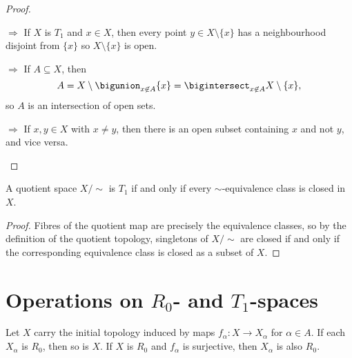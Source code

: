 \documentclass[article, a4paper, 11pt, oneside]{memoir}
\numberwithin{equation}{chapter}
\renewcommand{\implies}{\Rightarrow}
\begin{document}
\begin{proof}
\begin{proofsec}
    \item[\subcref{enum:T1-space} $\implies$ \subcref{enum:T1-singletons-closed}]
    If $X$ is $T_1$ and $x \in X$, then every point $y \in X \setminus \{x\}$ has a neighbourhood disjoint from $\{x\}$ so $X \setminus \{x\}$ is open.

    \item[\subcref{enum:T1-singletons-closed} $\implies$ \subcref{enum:T1-intersection-of-nhoods}]
    If $A \subseteq X$, then
    \begin{equation*}
        A   = X \setminus \bigunion_{x \not\in A} \{x\}
            = \bigintersect_{x \not\in A} X \setminus \{x\},
    \end{equation*}
    so $A$ is an intersection of open sets.

    \item[\subcref{enum:T1-intersection-of-nhoods} $\implies$ \subcref{enum:T1-space}]
    If $x,y \in X$ with $x \neq y$, then there is an open subset containing $x$ and not $y$, and vice versa.
\end{proofsec}
\end{proof}


\begin{corollary}
    \label{cor:T1-quotient}
    A quotient space $X/{\sim}$ is $T_1$ if and only if every $\sim$-equivalence class is closed in $X$.
\end{corollary}

\begin{proof}
    Fibres of the quotient map are precisely the equivalence classes, so by the definition of the quotient topology, singletons of $X/{\sim}$ are closed if and only if the corresponding equivalence class is closed as a subset of $X$.
\end{proof}



\section[Operations on R0- and T1-spaces][Operations on $R_0$- and $T_1$-spaces]{Operations on $R_0$- and $T_1$-spaces}

\begin{proposition}
    \label{prop:R0-initial-topology}
    Let $X$ carry the initial topology induced by maps $f_\alpha \colon X \to X_\alpha$ for $\alpha \in A$. If each $X_\alpha$ is $R_0$, then so is $X$. If $X$ is $R_0$ and $f_\alpha$ is surjective, then $X_\alpha$ is also $R_0$.
\end{proposition}
\end{document}

